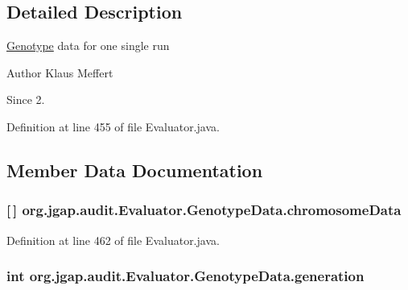 \subsection{Detailed Description}
\hyperlink{classorg_1_1jgap_1_1_genotype}{Genotype} data for one single run

\begin{DoxyAuthor}{Author}
Klaus Meffert 
\end{DoxyAuthor}
\begin{DoxySince}{Since}
2. 
\end{DoxySince}


Definition at line 455 of file Evaluator.\-java.



\subsection{Member Data Documentation}
\hypertarget{classorg_1_1jgap_1_1audit_1_1_evaluator_1_1_genotype_data_ad8d0692df61f7aff7fa647c7f89bcd5e}{
\subsubsection[{chromosome\-Data}]{ \mbox{[}$\,$\mbox{]} org.\-jgap.\-audit.\-Evaluator.\-Genotype\-Data.\-chromosome\-Data}}\label{classorg_1_1jgap_1_1audit_1_1_evaluator_1_1_genotype_data_ad8d0692df61f7aff7fa647c7f89bcd5e}


Definition at line 462 of file Evaluator.\-java.

\hypertarget{classorg_1_1jgap_1_1audit_1_1_evaluator_1_1_genotype_data_a5290ac0e1221be8a3dc8f476345cf9cf}{
\subsubsection[{generation}]{\setlength{\rightskip}{0pt plus 5cm}int org.\-jgap.\-audit.\-Evaluator.\-Genotype\-Data.\-generation}}\label{classorg_1_1jgap_1_1audit_1_1_evaluator_1_1_genotype_data_a5290ac0e1221be8a3dc8f476345cf9cf}


